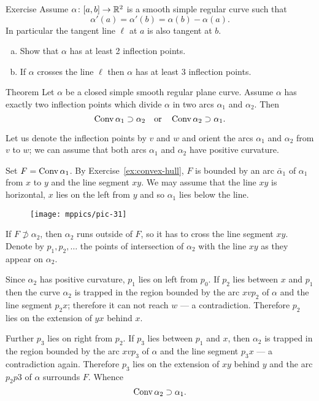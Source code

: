 \begin{thm}{Exercise}
Assume $\alpha\colon[a,b]\to\mathbb{R}^2$ is a smooth simple regular curve such that 
\[\alpha'(a)=\alpha'(b)=\alpha(b)-\alpha(a).\]
In particular the tangent line $\ell$ at $a$ is also tangent at $b$.
\begin{enumerate}[(a)]
\item
Show that $\alpha$ has at least 2 inflection points.
\item
If $\alpha$ crosses the line $\ell$ then $\alpha$ has at least 3 inflection points.
\end{enumerate}
\end{thm}

\begin{thm}{Theorem} 
Let $\alpha$ be a closed simple smooth regular plane curve.
Assume $\alpha$ has exactly two inflection points which divide $\alpha$ in two arcs $\alpha_1$ and $\alpha_2$.
Then 
\[\mathop{\rm Conv}\nolimits \alpha_1\supset \alpha_2
\quad\text{or}\quad
\mathop{\rm Conv}\nolimits \alpha_2\supset \alpha_1.\]

\end{thm}

Let us denote the inflection points by $v$ and $w$
and orient the arcs $\alpha_1$ and $\alpha_2$ from $v$ to $w$; we can assume that both arcs $\alpha_1$ and $\alpha_2$ have positive curvature.

Set $F=\mathop{\rm Conv}\nolimits \alpha_1$.
By Exercise~\ref{ex:convex-hull}, $F$ is bounded by an arc $\bar\alpha_1$ of $\alpha_1$ from $x$ to $y$ 
and the line segment $xy$.
We may assume that the line $xy$ is horizontal, $x$ lies on the left from $y$ and so $\alpha_1$ lies below the line.

\begin{figure}[h!]
\vskip-0mm
\centering
\texttt{[image: mppics/pic-31]}
\vskip0mm
\end{figure}

If $F\not\supset \alpha_2$, then $\alpha_2$ runs outside of $F$, so it has to cross the line segment $xy$.
Denote by $p_1, p_2,\dots$ the points of intersection of $\alpha_2$ with the line $xy$ as they appear on $\alpha_2$.

Since $\alpha_2$ has positive curvature, $p_1$ lies on left from $p_0$.
If $p_2$ lies between $x$ and $p_1$ then the curve $\alpha_2$ is trapped in the region bounded by the arc $xvp_2$ of $\alpha$ and the line segment $p_2x$;
therefore it can not reach $w$ --- a contradiction.
Therefore $p_2$ lies on the extension of $yx$ behind $x$.

Further $p_3$ lies on right from $p_2$. 
If $p_3$ lies between $p_1$ and $x$, then $\alpha_2$ is trapped in the region bounded by the arc $xvp_3$ of $\alpha$ and the line segment $p_3x$ --- a contradiction again.
Therefore $p_3$ lies on the extension of $xy$ behind $y$ and the arc $p_2p3$ of $\alpha$ surrounds $F$.
Whence
\[\mathop{\rm Conv}\nolimits \alpha_2\supset \alpha_1.\]
\qedsf


